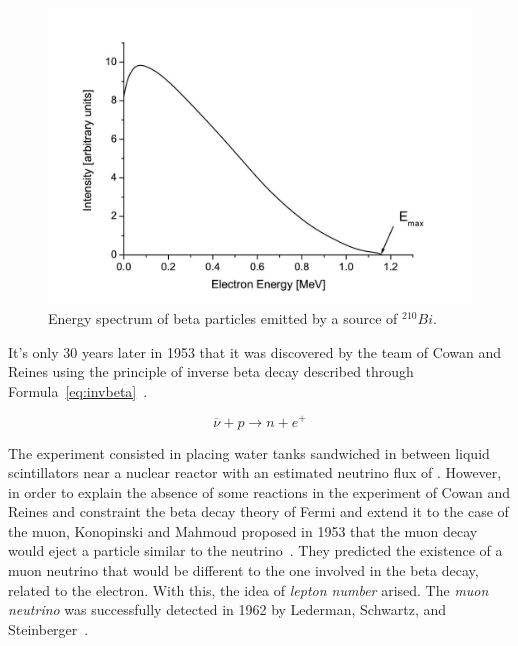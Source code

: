 	\begin{figure}
		\centering
		\includegraphics[width=\linewidth]{fig/chapt2/Beta-decay-electron-spectrum.jpg}
		\caption{\label{fig:beta-decay} Energy spectrum of beta particles emitted by a source of $^{210}Bi$.}
	\end{figure}
	
	It's only 30 years later in 1953 that it was discovered by the team of Cowan and Reines using the principle of inverse beta decay described through Formula~\ref{eq:invbeta}~\cite{COWAN1953}.
	
	\begin{equation}
		\label{eq:invbeta}
		\overline{\nu} + p \rightarrow n + e^+
	\end{equation}
	
	The experiment consisted in placing water tanks sandwiched in between liquid scintillators near a nuclear reactor with an estimated neutrino flux of \siflux. However, in order to explain the absence of some reactions in the experiment of Cowan and Reines and constraint the beta decay theory of Fermi and extend it to the case of the muon, Konopinski and Mahmoud proposed in 1953 that the muon decay would eject a particle similar to the neutrino~\cite{KONOPINSKI1953}. They predicted the existence of a muon neutrino that would be different to the one involved in the beta decay, related to the electron. With this, the idea of \textit{lepton number} arised. The \textit{muon neutrino} was successfully detected in 1962 by Lederman, Schwartz, and Steinberger~\cite{LEDERMAN1962}.
	
\endgroup
	
